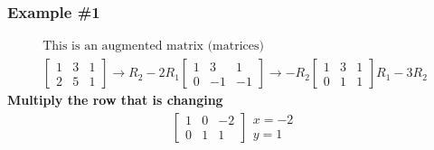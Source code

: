 \documentclass[11pt]{article} %
\begin{document}
\subsubsection*{Example \#1}
\begin{gather*}
\text{This is an augmented matrix (matrices)}\\
\begin{bmatrix}
1 & 3 & 1\\
2 & 5 & 1
\end{bmatrix} \rightarrow R_2 - 2R_1
\begin{bmatrix}
1 & 3 & 1\\
0 & -1 & -1
\end{bmatrix} \rightarrow -R_2
\begin{bmatrix}
1 & 3 & 1\\
0 & 1 & 1
\end{bmatrix} R_1 - 3R_2
\end{gather*}
\textbf{Multiply the row that is changing}\\
\begin{gather*}
\begin{bmatrix}
1 & 0 & -2\\
0 & 1 & 1
\end{bmatrix} 
\begin{align*}
x = -2 \\ y = 1
\end{align*}
\end{gather*}
\end{document}
